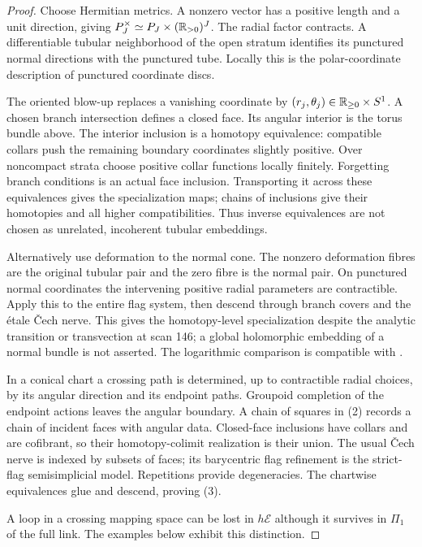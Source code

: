 \begin{proof}
Choose Hermitian metrics. A nonzero vector has a positive length
and a unit direction, giving
$P_J^\times\simeq P_J\times(\mathbb R_{>0})^J$.
The radial factor contracts. A differentiable tubular neighborhood
of the open stratum identifies its punctured normal directions
with the punctured tube. Locally this is the polar-coordinate
description of punctured coordinate discs.

The oriented blow-up replaces a vanishing coordinate by
$(r_j,\theta_j)\in\mathbb R_{\ge0}\times S^1$. A chosen branch
intersection defines a closed face. Its angular interior is the
torus bundle above. The interior inclusion is a homotopy
equivalence: compatible collars push the remaining boundary
coordinates slightly positive. Over noncompact strata choose
positive collar functions locally finitely. Forgetting branch
conditions is an actual face inclusion. Transporting it across
these equivalences gives the specialization maps; chains of
inclusions give their homotopies and all higher compatibilities.
Thus inverse equivalences are not chosen as unrelated,
incoherent tubular embeddings.

Alternatively use deformation to the normal cone. The nonzero
deformation fibres are the original tubular pair and the zero
fibre is the normal pair. On punctured normal coordinates the
intervening positive radial parameters are contractible.
Apply this to the entire flag system, then descend through
branch covers and the étale Čech nerve. This gives the
homotopy-level specialization despite the analytic transition
or transvection at scan 146; a global holomorphic embedding
of a normal bundle is not asserted. The logarithmic comparison
is compatible with \citet{KatoNakayama1999}.

In a conical chart a crossing path is determined, up to
contractible radial choices, by its angular direction and
its endpoint paths. Groupoid completion of the endpoint
actions leaves the angular boundary. A chain of squares in
(2) records a chain of incident faces with angular data.
Closed-face inclusions have collars and are cofibrant, so
their homotopy-colimit realization is their union.
The usual Čech nerve is indexed by subsets of faces;
its barycentric flag refinement is the strict-flag
semisimplicial model. Repetitions provide degeneracies.
The chartwise equivalences glue and descend, proving (3).

A loop in a crossing mapping space can be lost in
$h\mathcal E$ although it survives in $\Pi_1$ of the full
link. The examples below exhibit this distinction.
\end{proof}

